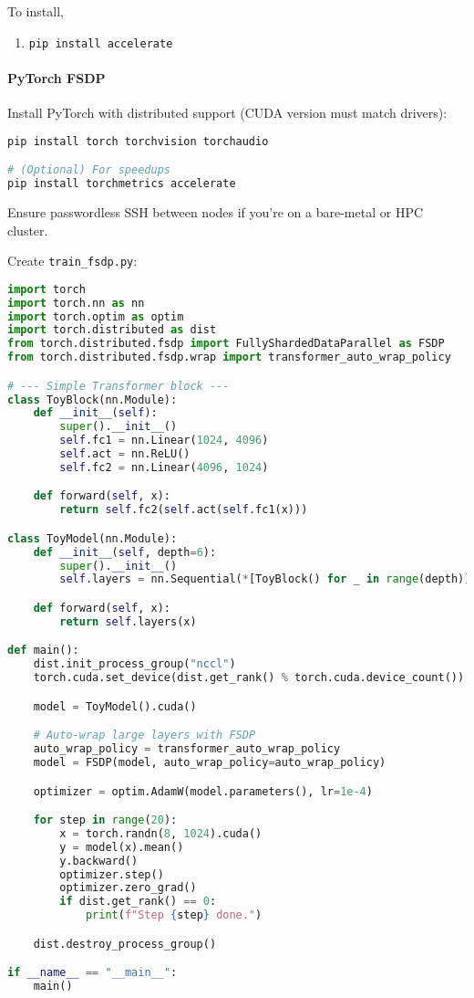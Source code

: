 To install,
\begin{enumerate}
	\item \texttt{pip install accelerate}
\end{enumerate}

\paragraph{PyTorch FSDP}

Install PyTorch with distributed support (CUDA version must match drivers):
\begin{lstlisting}[language=Python]
pip install torch torchvision torchaudio

# (Optional) For speedups
pip install torchmetrics accelerate
\end{lstlisting}

Ensure passwordless SSH between nodes if you're on a bare-metal or HPC cluster.

Create \texttt{train\_fsdp.py}:

\begin{lstlisting}[language=Python]
import torch
import torch.nn as nn
import torch.optim as optim
import torch.distributed as dist
from torch.distributed.fsdp import FullyShardedDataParallel as FSDP
from torch.distributed.fsdp.wrap import transformer_auto_wrap_policy

# --- Simple Transformer block ---
class ToyBlock(nn.Module):
    def __init__(self):
        super().__init__()
        self.fc1 = nn.Linear(1024, 4096)
        self.act = nn.ReLU()
        self.fc2 = nn.Linear(4096, 1024)

    def forward(self, x):
        return self.fc2(self.act(self.fc1(x)))

class ToyModel(nn.Module):
    def __init__(self, depth=6):
        super().__init__()
        self.layers = nn.Sequential(*[ToyBlock() for _ in range(depth)])

    def forward(self, x):
        return self.layers(x)

def main():
    dist.init_process_group("nccl")
    torch.cuda.set_device(dist.get_rank() % torch.cuda.device_count())

    model = ToyModel().cuda()

    # Auto-wrap large layers with FSDP
    auto_wrap_policy = transformer_auto_wrap_policy
    model = FSDP(model, auto_wrap_policy=auto_wrap_policy)

    optimizer = optim.AdamW(model.parameters(), lr=1e-4)

    for step in range(20):
        x = torch.randn(8, 1024).cuda()
        y = model(x).mean()
        y.backward()
        optimizer.step()
        optimizer.zero_grad()
        if dist.get_rank() == 0:
            print(f"Step {step} done.")

    dist.destroy_process_group()

if __name__ == "__main__":
    main()
\end{lstlisting}

